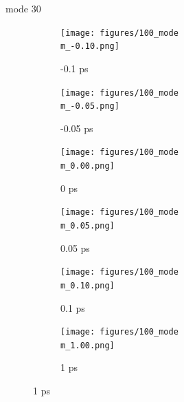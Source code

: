 \documentclass{beamer}
\newcommand\w{0.32}
\begin{document}
\renewcommand\m{30}
\begin{frame}{mode \m}
	\begin{figure}
		\centering
		\begin{subfigure}[b]{\w\textwidth}
			\centering
			\texttt{[image: figures/100\_mode\\m\_-0.10.png]}
			\caption{-0.1 ps}
		\end{subfigure}
		\begin{subfigure}[b]{\w\textwidth}
			\centering
			\texttt{[image: figures/100\_mode\\m\_-0.05.png]}
			\caption{-0.05 ps}
		\end{subfigure}
		\begin{subfigure}[b]{\w\textwidth}
			\centering
			\texttt{[image: figures/100\_mode\\m\_0.00.png]}
			\caption{0 ps}
		\end{subfigure}
		\begin{subfigure}[b]{\w\textwidth}
			\centering
			\texttt{[image: figures/100\_mode\\m\_0.05.png]}
			\caption{0.05 ps}
		\end{subfigure}
		\begin{subfigure}[b]{\w\textwidth}
			\centering
			\texttt{[image: figures/100\_mode\\m\_0.10.png]}
			\caption{0.1 ps}
		\end{subfigure}
		\begin{subfigure}[b]{\w\textwidth}
			\centering
			\texttt{[image: figures/100\_mode\\m\_1.00.png]}
			\caption{1 ps}
		\end{subfigure}
	\end{figure}
\end{frame}
\end{document}
